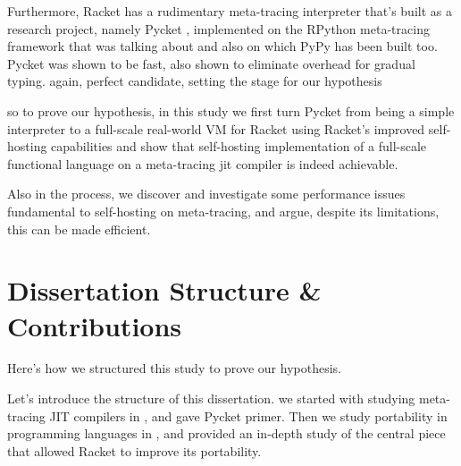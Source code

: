     \begin{paragraph-here}%
        Furthermore, Racket has a rudimentary meta-tracing interpreter that's built as a research project, namely Pycket \cite{bolzMetatracingMakesFast2014}, implemented on the RPython meta-tracing framework that \cite{bolzPhDThesis} was talking about and also on which PyPy has been built too.
        Pycket was shown to be fast, also shown to eliminate overhead for gradual typing. again, perfect candidate, setting the stage for our hypothesis \cite{pycketmain,pycketmain2}
    \end{paragraph-here}

    \begin{paragraph-here}%
        so to prove our hypothesis, in this study we first turn Pycket from being a simple interpreter to a full-scale real-world VM for Racket using Racket's improved self-hosting capabilities and show that self-hosting implementation of a full-scale functional language on a meta-tracing \gls{jit} compiler is indeed achievable.
    \end{paragraph-here}

    \begin{paragraph-here}%
        Also in the process, we discover and investigate some performance issues fundamental to self-hosting on meta-tracing, and argue, despite its limitations, this can be made efficient.
    \end{paragraph-here}

    \section[\texorpdfstring{Dissertation Structure \& Contributions}{Structure \& Contributions}]{Dissertation Structure \& Contributions}

    \begin{mainpoint}
        Here's how we structured this study to prove our hypothesis.
    \end{mainpoint}

    \begin{paragraph-here}%
        Let's introduce the structure of this dissertation.
        we started with studying meta-tracing JIT compilers in , and gave Pycket primer. Then we study portability in programming languages in , and provided an in-depth study of the central piece that allowed Racket to improve its portability.
    \end{paragraph-here}

